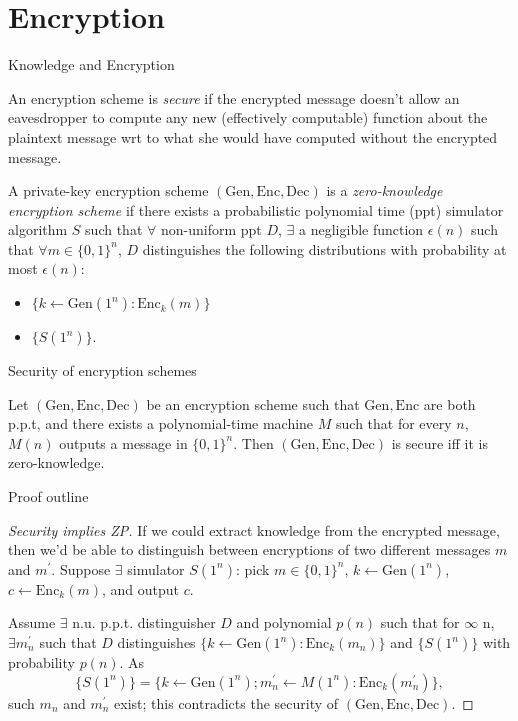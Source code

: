 \section{Encryption}
\begin{frame}{Knowledge and Encryption}
\vspace{-7pt}
\begin{definition}
An encryption scheme is \textit{secure} if the encrypted message doesn't allow an eavesdropper to compute any new (effectively computable) function about the plaintext message wrt to what she would have computed without the encrypted message.
\end{definition}
\begin{definition}
A private-key encryption scheme $(\mathrm{Gen}, \mathrm{Enc}, \mathrm{Dec})$ is a \textit{zero-knowledge encryption scheme} if there exists a probabilistic polynomial time (ppt) simulator algorithm $S$ such that $\forall$ non-uniform ppt $D$, $\exists$ a negligible function $\epsilon(n)$ such that $\forall m \in \{0, 1\}^n$,  $D$ distinguishes the following distributions with probability at most $\epsilon(n)$:
\begin{itemize}
    \item $\{k \leftarrow \mathrm{Gen}(1^n) : \mathrm{Enc}_k(m)\}$
    \item $\{S(1^n)\}$.
\end{itemize}
\end{definition}
\end{frame}

\begin{frame}{Security of encryption schemes}
    \begin{theorem}
    Let $(\mathrm{Gen}, \mathrm{Enc}, \mathrm{Dec})$ be an encryption scheme such that $\mathrm{Gen}, \mathrm{Enc}$ are both p.p.t, and there exists a polynomial-time machine $M$ such that for every $n$, $M(n)$ outputs a message in $\{0, 1\}^n$. Then $(\mathrm{Gen}, \mathrm{Enc}, \mathrm{Dec})$ is secure iff it is zero-knowledge.
    \end{theorem}
\end{frame}

\begin{frame}{Proof outline}
    \begin{proof}[Security implies ZP]
    If we could extract knowledge from the encrypted message, then we'd be able to distinguish between encryptions of two different messages $m$ and $m^\prime$. Suppose $\exists$ simulator $S(1^n)$: pick $m \in \{0, 1\}^n$, $k \leftarrow \mathrm{Gen}(1^n)$, $c \leftarrow \mathrm{Enc}_k(m)$, and output $c$. 
    
    Assume $\exists$ n.u. p.p.t. distinguisher $D$ and polynomial $p(n)$ such that for $\infty$ n, $\exists m_n^\prime$ such that $D$ distinguishes $\{k \leftarrow \mathrm{Gen}(1^n) : \mathrm{Enc}_k(m_n)\}$ and $\{S(1^n)\}$ with probability $p(n)$. As $$\{S(1^n)\} = \{k \leftarrow \mathrm{Gen}(1^n); m_n^\prime \leftarrow M(1^n) : \mathrm{Enc}_k(m^\prime_n)\},$$ such $m_n$ and $m^\prime_n$ exist; this contradicts the security of $(\mathrm{Gen}, \mathrm{Enc}, \mathrm{Dec})$.
    \end{proof}
\end{frame}

